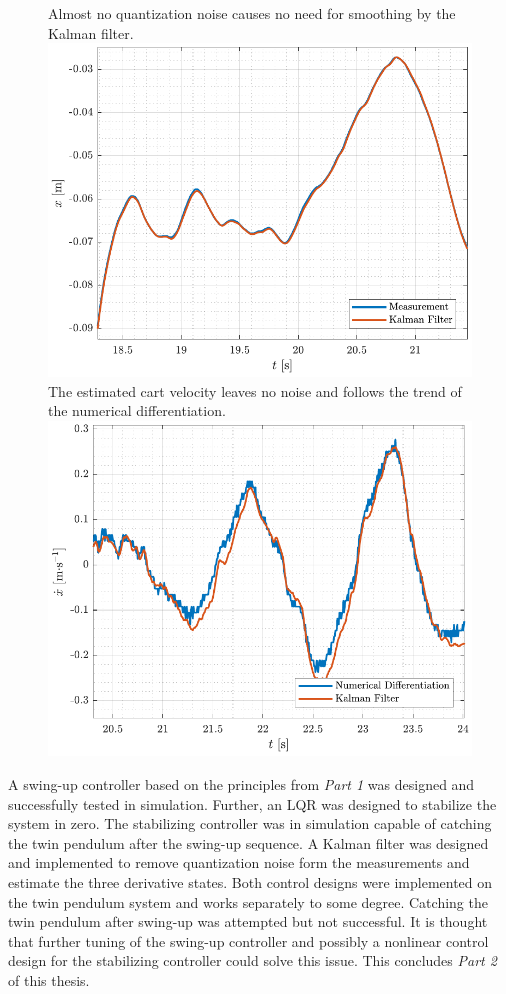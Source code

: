 \begin{figure}[H]
  \hspace{-10pt}
  \captionbox
  {
    Almost no quantization noise causes no need for smoothing by the Kalman filter.
    \label{fig:xKFtest}
  }
  {
    \hspace{-1cm}
    \includegraphics[width=.5\textwidth]{figures/xKFtest}
  }
  \hspace{20pt}
  \captionbox 
  {
    The estimated cart velocity leaves no noise and follows the trend of the numerical differentiation.
    \label{fig:xDotKFtest}
  }
  {
    \hspace{-1cm}
    \includegraphics[width=.5\textwidth]{figures/xDotKFtest}
  }  
\end{figure}

A swing-up controller based on the principles from \textit{Part 1} was designed and successfully tested in simulation. Further, an LQR was designed to stabilize the system in zero. The stabilizing controller was in simulation capable of catching the twin pendulum after the swing-up sequence. A Kalman filter was designed and implemented to remove quantization noise form the measurements and estimate the three derivative states. Both control designs were implemented on the twin pendulum system and works separately to some degree. Catching the twin pendulum after swing-up was attempted but not successful. It is thought that further tuning of the swing-up controller and possibly a nonlinear control design for the stabilizing controller could solve this issue. This concludes \textit{Part 2} of this thesis.